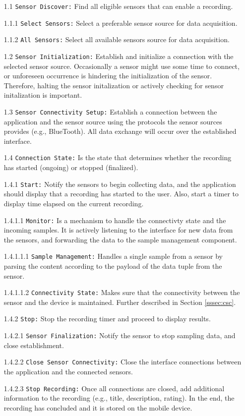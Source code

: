 \begin{itemize}
    \item[1.1] \verb|Sensor Discover:| Find all eligible sensors that can enable a recording.
    \item[1.1.1] \verb|Select Sensors:| Select a preferable sensor source for data acquisition. 
    \item[1.1.2] \verb|All Sensors:| Select all available sensors source for data acquisition.
    \item[1.2] \verb|Sensor Initialization:| Establish and initialize a connection with the selected sensor source. Occasionally a sensor might use some time to connect, or unforeseen occurrence is hindering the initialization of the sensor. Therefore, halting the sensor initalization or actively checking for sensor initalization is important. 
    \item[1.3] \verb|Sensor Connectivity Setup:| Establish a connection between the application and the sensor source using the protocols the sensor sources provides (e.g., BlueTooth). All data exchange will occur over the established interface. 
    \item[1.4] \verb|Connection State:| Is the state that determines whether the recording has started (ongoing) or stopped (finalized).
    \item[1.4.1] \verb|Start:| Notify the sensors to begin collecting data, and the application should display that a recording has started to the user. Also, start a timer to display time elapsed on the current recording. 
    \item[1.4.1.1] \verb|Monitor:| Is a mechanism to handle the connectivty state and the incoming samples. It is actively listening to the interface for new data from the sensors, and forwarding the data to the sample management component.  
    \item[1.4.1.1.1] \verb|Sample Management:| Handles a single sample from a sensor by parsing the content according to the payload of the data tuple from the sensor.
    \item[1.4.1.1.2] \verb|Connectivity State:| Makes sure that the connectivity between the sensor and the device is maintained. Further described in Section \ref{sssec:csc}.
    \item[1.4.2] \verb|Stop:| Stop the recording timer and proceed to display results.
    \item[1.4.2.1] \verb|Sensor Finalization:| Notify the sensor to stop sampling data, and close establishment.
    \item[1.4.2.2] \verb|Close Sensor Connectivity:| Close the interface connections between the application and the connected sensors. 
    \item[1.4.2.3] \verb|Stop Recording:| Once all connections are closed, add additional information to the recording (e.g., title, description, rating). In the end, the recording has concluded and it is stored on the mobile device.
\end{itemize}

